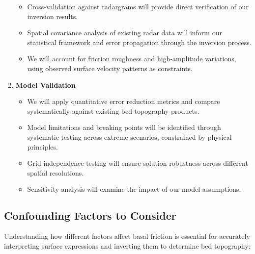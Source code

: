 \begin{enumerate}
\begin{itemize}
    \item Cross-validation against radargrams will provide direct verification of our inversion results.
    
    \item Spatial covariance analysis of existing radar data will inform our statistical framework and error propagation through the inversion process.
    
    \item We will account for friction roughness and high-amplitude variations, using observed surface velocity patterns as constraints.
    \end{itemize}

\item\textbf{Model Validation}
    \begin{itemize}
    \item We will apply quantitative error reduction metrics and compare systematically against existing bed topography products.
    
    \item Model limitations and breaking points will be identified through systematic testing across extreme scenarios, constrained by physical principles.
    
    \item Grid independence testing will ensure solution robustness across different spatial resolutions.
    
    \item Sensitivity analysis will examine the impact of our model assumptions.
    \end{itemize}
\end{enumerate}


\subsection*{Confounding Factors to Consider}

Understanding how different factors affect basal friction is essential for accurately interpreting surface expressions and inverting them to determine bed topography:

